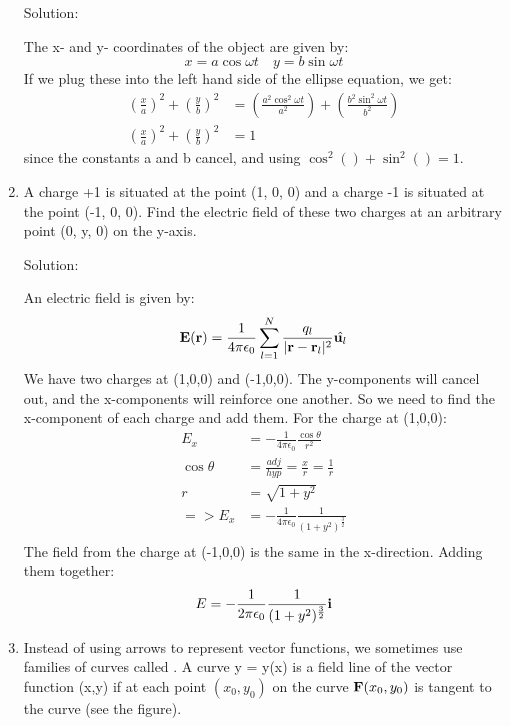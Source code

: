 \documentclass{article}
\begin{document}
\begin{enumerate}
    Solution:

    The x- and y- coordinates of the object are given by:
    \[ x = a\cos{\omega t} \quad  y = b\sin{\omega t} \]
    If we plug these into the left hand side of the ellipse equation, we get:
    \begin{align*}
        {\left(\frac{x}{a}\right)}^2 + {\left(\frac{y}{b}\right)}^2 &= {\left(\frac{a^2\cos^2{\omega t}}{a^2} \right)} + {\left(\frac{b^2\sin^2{\omega t}}{b^2} \right)} \\
        {\left(\frac{x}{a}\right)}^2 + {\left(\frac{y}{b}\right)}^2 &= 1
    \end{align*}
    since the constants a and b cancel, and using $\cos^2() + \sin^2() = 1$.

    \item A charge +1 is situated at the point (1, 0, 0) and a charge -1 is
    situated at the point (-1, 0, 0). Find the electric field of these two charges
    at an arbitrary point (0, y, 0) on the y-axis.

    Solution:

    An electric field is given by:
    \[ \textbf{E}(\textbf{r}) = \frac{1}{4\pi\epsilon_0}\sum_{l=1}^{N}\frac{q_l}{|\textbf{r}-\textbf{r}_l|^2} \hat{\textbf{u}_l} \]
    We have two charges at (1,0,0) and (-1,0,0). The y-components will cancel out, and the
    x-components will reinforce one another. So we need to find the x-component of each
    charge and add them. For the charge at (1,0,0):
    \begin{align*}
        E_x &= -\frac{1}{4 \pi \epsilon_0} \frac{\cos{\theta}}{r^2} \\
        \cos{\theta} &= \frac{adj}{hyp} = \frac{x}{r} = \frac{1}{r} \\
        r &= \sqrt{1 + y^2} \\
        => E_x &= -\frac{1}{4 \pi \epsilon_0} \frac{1}{(1+y^2)^\frac{3}{2}} \\
    \end{align*}
    The field from the charge at (-1,0,0) is the same in the x-direction. Adding them together:
    \[ E = -\frac{1}{2 \pi \epsilon_0} \frac{1}{(1+y^2)^\frac{3}{2}} \textbf{i} \]

    \item Instead of using arrows to represent vector functions, we sometimes use families
    of curves called . A curve y = y(x) is a field line of the vector
    function (x,y) if at each point $(x_0, y_0)$ on the curve $\textbf{F}(x_0, y_0)$
    is tangent to the curve (see the figure). %


\end{enumerate}
\end{document}
